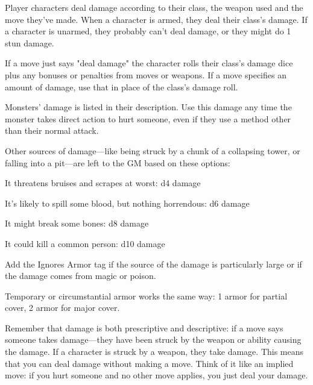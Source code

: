 

Player characters deal damage according to their class, the weapon used and the move they've made. When a character is armed, they deal their class's damage. If a character is unarmed, they probably can't deal damage, or they might do 1 stun damage.

 

If a move just says "deal damage" the character rolls their class's damage dice plus any bonuses or penalties from moves or weapons. If a move specifies an amount of damage, use that in place of the class's damage roll.

 

Monsters' damage is listed in their description. Use this damage any time the monster takes direct action to hurt someone, even if they use a method other than their normal attack.

 

Other sources of damage—like being struck by a chunk of a collapsing tower, or falling into a pit—are left to the GM based on these options:

 
\startitemize[1,packed]

\item It threatens bruises and scrapes at worst: d4 damage

 
\item It's likely to spill some blood, but nothing horrendous: d6 damage

 
\item It might break some bones: d8 damage

 
\item It could kill a common person: d10 damage


\stopitemize
 

Add the Ignores Armor tag if the source of the damage is particularly large or if the damage comes from magic or poison.

 

Temporary or circumstantial armor works the same way: 1 armor for partial cover, 2 armor for major cover.

 

Remember that damage is both prescriptive and descriptive: if a move says someone takes damage—they have been struck by the weapon or ability causing the damage. If a character is struck by a weapon, they take damage. This means that you can deal damage without making a move. Think of it like an implied move: if you hurt someone and no other move applies, you just deal your damage.

